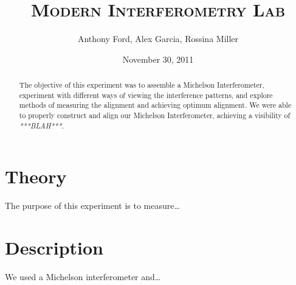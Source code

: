 \documentclass[12pt,titlepage,final]{article}
\begin{document}
\title{\textsc{Modern Interferometry Lab}}
\author{Anthony Ford, Alex Garcia, Rossina Miller}
\date{November 30, 2011}
\maketitle

\clearpage

\begin{abstract}
The objective of this experiment was to assemble a Michelson Interferometer,
experiment with different ways of viewing the interference patterns, and explore
methods of measuring the alignment and achieving optimum alignment. We were able
to properly construct and align our Michelson Interferometer, achieving a
visibility of \emph{***BLAH***}.
\end{abstract}



\section{Theory}

The purpose of this experiment is to measure\ldots


\section{Description}

We used a Michelson interferometer and\ldots
\end{document}
